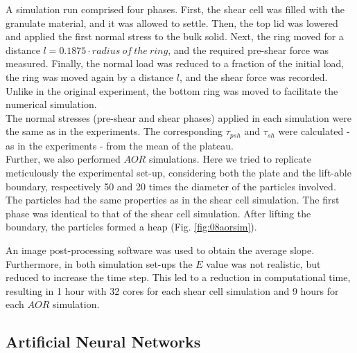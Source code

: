 A simulation run comprised four phases. 
First, the shear cell was filled with the granulate material, and it was allowed to settle. 
Then, the top lid was lowered and applied the first normal stress to the bulk solid. 
Next, the ring moved for a distance $l=0.1875 \cdot radius ~of ~the ~ring$, and the required pre-shear force was measured. 
Finally, the normal load was reduced to a fraction of the initial load, the ring was moved again by a distance $l$, and the shear force was recorded. 
Unlike in the original experiment, the bottom ring was moved to facilitate the numerical simulation.\\
The normal stresses (pre-shear and shear phases) applied in each simulation were
the same as in the experiments. The corresponding $\tau_{psh}$ and $\tau_{sh}$
were calculated - as in the experiments - from the mean of the plateau.\\

Further, we also performed $AOR$ simulations. Here we tried to replicate meticulously the experimental set-up, considering both the plate and the lift-able boundary, 
respectively 50 and 20 times the diameter of the particles involved.
The particles had the same properties as in the shear cell simulation.
The first phase was identical to that of the shear cell simulation. 
After lifting the boundary, the particles formed a heap (Fig. \ref{fig:08aorsim}). 

An image post-processing software was used to obtain the average slope.
Furthermore, in both simulation set-ups the $E$ value was not realistic, but reduced to increase the time step.
This led to a reduction in computational time, resulting in 1 hour with 32 cores
for each shear cell simulation and 9 hours for each $AOR$ simulation.\\

\subsection{Artificial Neural Networks}
\label{subsec:ann}

